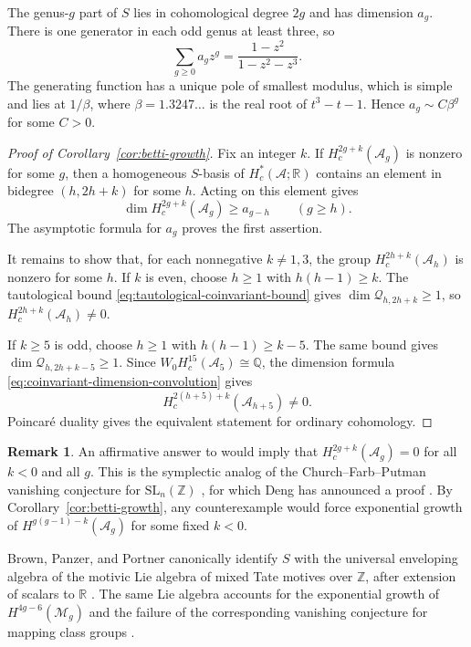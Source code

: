 \documentclass[12 pt]{amsart}
\newcommand{\QQ}{\mathbb{Q}}
\newcommand{\RR}{\mathbb{R}}
\newcommand{\ZZ}{\mathbb{Z}}
\newcommand{\cA}{\mathcal{A}}
\newcommand{\cM}{\mathcal{M}}
\newcommand{\cQ}{\mathcal{Q}}
\newcommand{\SL}{\mathrm{SL}}
\newcommand{\<}{\langle}
\renewcommand{\>}{\rangle}
\theoremstyle{definition}
\newtheorem{remark}[theorem]{Remark}
\begin{document}
The genus-$g$ part of $S$ lies in cohomological degree $2g$ and has dimension $a_g$. There is one generator in each odd genus at least three, so
\[
\sum_{g \geq 0} a_g z^g = \frac{1 - z^2}{1 - z^2 - z^3}.
\]
The generating function has a unique pole of smallest modulus, which is simple and lies at $1/\beta$, where $\beta = 1.3247 \ldots$ is the real root of $t^3 - t - 1$. Hence $a_g \sim C \beta^g$ for some $C > 0$.

\begin{proof}[Proof of Corollary~\ref{cor:betti-growth}]
Fix an integer $k$. If $H_c^{2g + k}(\cA_g)$ is nonzero for some $g$, then a homogeneous $S$-basis of $H_c^*(\cA; \RR)$ contains an element in bidegree $(h, 2h + k)$ for some $h$. Acting on this element gives
\[
\dim H_c^{2g + k}(\cA_g) \geq a_{g - h} \qquad (g \geq h).
\]
The asymptotic formula for $a_g$ proves the first assertion.

It remains to show that, for each nonnegative $k \neq 1, 3$, the group $H_c^{2h + k}(\cA_h)$ is nonzero for some $h$. If $k$ is even, choose $h \geq 1$ with $h(h - 1) \geq k$. The tautological bound \eqref{eq:tautological-coinvariant-bound} gives $\dim \cQ_{h, 2h + k} \geq 1$, so $H_c^{2h + k}(\cA_h) \neq 0$.

If $k \geq 5$ is odd, choose $h \geq 1$ with $h(h - 1) \geq k - 5$. The same bound gives $\dim \cQ_{h, 2h + k - 5} \geq 1$. Since $W_0 H_c^{15}(\cA_5) \cong \QQ$, the dimension formula \eqref{eq:coinvariant-dimension-convolution} gives
\[
H_c^{2(h + 5) + k}(\cA_{h + 5}) \neq 0.
\]
Poincar\'e duality gives the equivalent statement for ordinary cohomology.
\end{proof}

\begin{remark}\label{rem:symplectic-vanishing}
An affirmative answer to \cite[Question~1.1]{BPS} would imply that $H_c^{2g + k}(\cA_g) = 0$ for all $k < 0$ and all $g$. This is the symplectic analog of the Church--Farb--Putman vanishing conjecture for $\SL_n(\ZZ)$ \cite[Conjecture~2]{CFP}, for which Deng has announced a proof \cite[Theorem~1.1]{DengCFP}. By Corollary~\ref{cor:betti-growth}, any counterexample would force exponential growth of $H^{g(g - 1) - k}(\cA_g)$ for some fixed $k < 0$.

Brown, Panzer, and Portner canonically identify $S$ with the universal enveloping algebra of the motivic Lie algebra of mixed Tate motives over $\ZZ$, after extension of scalars to $\RR$ \cite[Theorem~24]{BrownPanzerPortner26}. The same Lie algebra accounts for the exponential growth of $H^{4g - 6}(\cM_g)$ and the failure of the corresponding vanishing conjecture for mapping class groups \cite[Theorems~1.1 and~2.7]{CGP}.
\end{remark}

\raggedbottom


\end{document}
